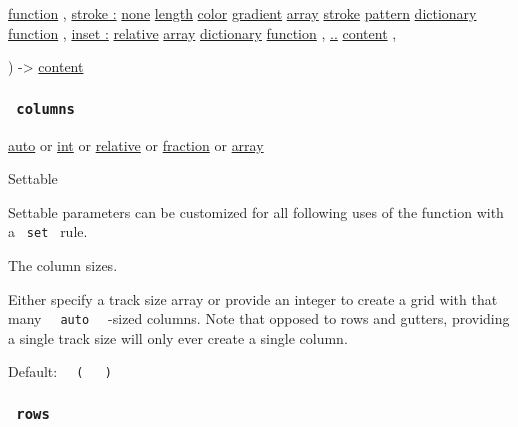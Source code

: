 {\href{/docs/reference/foundations/function/}{function} , } {
\hyperref[parameters-stroke]{stroke :}
\href{/docs/reference/foundations/none/}{none}
\href{/docs/reference/layout/length/}{length}
\href{/docs/reference/visualize/color/}{color}
\href{/docs/reference/visualize/gradient/}{gradient}
\href{/docs/reference/foundations/array/}{array}
\href{/docs/reference/visualize/stroke/}{stroke}
\href{/docs/reference/visualize/pattern/}{pattern}
\href{/docs/reference/foundations/dictionary/}{dictionary}
\href{/docs/reference/foundations/function/}{function} , } {
\hyperref[parameters-inset]{inset :}
\href{/docs/reference/layout/relative/}{relative}
\href{/docs/reference/foundations/array/}{array}
\href{/docs/reference/foundations/dictionary/}{dictionary}
\href{/docs/reference/foundations/function/}{function} , } {
\hyperref[parameters-children]{..}
\href{/docs/reference/foundations/content/}{content} , }

) -\textgreater{} \href{/docs/reference/foundations/content/}{content}

\subsubsection{\texorpdfstring{\texttt{\ columns\ }}{ columns }}\label{parameters-columns}

\href{/docs/reference/foundations/auto/}{auto} {or}
\href{/docs/reference/foundations/int/}{int} {or}
\href{/docs/reference/layout/relative/}{relative} {or}
\href{/docs/reference/layout/fraction/}{fraction} {or}
\href{/docs/reference/foundations/array/}{array}

{{ Settable }}

\label{parameters-columns-settable-tooltip}
Settable parameters can be customized for all following uses of the
function with a \texttt{\ set\ } rule.

The column sizes.

Either specify a track size array or provide an integer to create a grid
with that many \texttt{\ }{\texttt{\ auto\ }}\texttt{\ } -sized columns.
Note that opposed to rows and gutters, providing a single track size
will only ever create a single column.

Default:
\texttt{\ }{\texttt{\ (\ }}\texttt{\ }{\texttt{\ )\ }}\texttt{\ }

\subsubsection{\texorpdfstring{\texttt{\ rows\ }}{ rows }}\label{parameters-rows}

